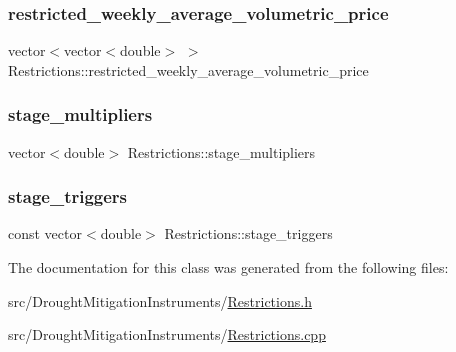 \subsubsection{\texorpdfstring{restricted\+\_\+weekly\+\_\+average\+\_\+volumetric\+\_\+price}{restricted\_weekly\_average\_volumetric\_price}}
{\footnotesize\ttfamily vector$<$vector$<$double$>$ $>$ Restrictions\+::restricted\+\_\+weekly\+\_\+average\+\_\+volumetric\+\_\+price\hspace{0.3cm}{\ttfamily [private]}}

\mbox{\label{classRestrictions_ae05c6899c05a7ffe39c4ceb7cdcd3daf_ae05c6899c05a7ffe39c4ceb7cdcd3daf}} 
\subsubsection{\texorpdfstring{stage\+\_\+multipliers}{stage\_multipliers}}
{\footnotesize\ttfamily vector$<$double$>$ Restrictions\+::stage\+\_\+multipliers\hspace{0.3cm}{\ttfamily [private]}}

\mbox{\label{classRestrictions_a1c519068b4ab14737f726817f1edf9d0_a1c519068b4ab14737f726817f1edf9d0}} 
\subsubsection{\texorpdfstring{stage\+\_\+triggers}{stage\_triggers}}
{\footnotesize\ttfamily const vector$<$double$>$ Restrictions\+::stage\+\_\+triggers\hspace{0.3cm}{\ttfamily [private]}}



The documentation for this class was generated from the following files\+:\begin{DoxyCompactItemize}
\item 
src/\+Drought\+Mitigation\+Instruments/\mbox{\hyperlink{Restrictions_8h}{Restrictions.\+h}}\item 
src/\+Drought\+Mitigation\+Instruments/\mbox{\hyperlink{Restrictions_8cpp}{Restrictions.\+cpp}}\end{DoxyCompactItemize}
